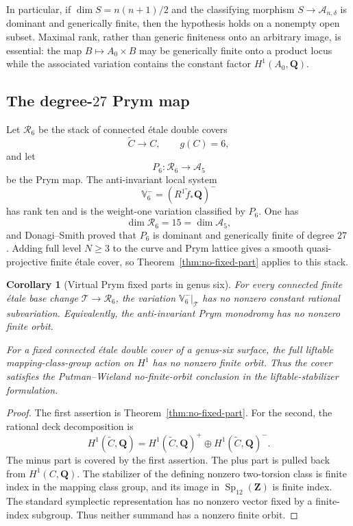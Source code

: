 \documentclass[11pt,reqno]{amsart}
\numberwithin{equation}{section}
\newtheorem{corollary}[theorem]{Corollary}
\theoremstyle{definition}
\theoremstyle{remark}
\newcommand{\Q}{\mathbf Q}
\newcommand{\Z}{\mathbf Z}
\newcommand{\cA}{\mathcal A}
\newcommand{\cR}{\mathcal R}
\newcommand{\Sp}{\operatorname{Sp}}
\begin{document}
In particular, if $\dim S=n(n+1)/2$ and the classifying morphism
$S\to\cA_{n,\delta}$ is dominant and generically finite, then the hypothesis holds on a nonempty open subset.  Maximal rank, rather than generic finiteness onto an arbitrary image, is essential: the map $B\mapsto A_0\times B$ may be generically finite onto a product locus while the associated variation contains the constant factor $H^1(A_0,\Q)$.

\subsection{The degree-\texorpdfstring{$27$}{27} Prym map}

Let $\cR_6$ be the stack of connected \'etale double covers
\[
\widetilde C\longrightarrow C,
\qquad g(C)=6,
\]
and let
\[
P_6:\cR_6\longrightarrow\cA_5
\]
be the Prym map.  The anti-invariant local system
\[
\mathbb V_6^-=(R^1\widetilde f_*\Q)^-
\]
has rank ten and is the weight-one variation classified by $P_6$.  One has
\[
\dim\cR_6=15=\dim\cA_5,
\]
and Donagi--Smith proved that $P_6$ is dominant and generically finite of degree $27$ \cite[Theorem~I.2.1]{DonagiSmith1981}.  Adding full level $N\ge3$ to the curve and Prym lattice gives a smooth quasi-projective finite \'etale cover, so Theorem~\ref{thm:no-fixed-part} applies to this stack.

\begin{corollary}[Virtual Prym fixed parts in genus six]\label{cor:P6}
For every connected finite \'etale base change $\mathscr T\to\cR_6$, the variation $\mathbb V_6^-|_{\mathscr T}$ has no nonzero constant rational subvariation.  Equivalently, the anti-invariant Prym monodromy has no nonzero finite orbit.

For a fixed connected \'etale double cover of a genus-six surface, the full liftable mapping-class-group action on $H^1$ has no nonzero finite orbit.  Thus the cover satisfies the Putman--Wieland no-finite-orbit conclusion in the liftable-stabilizer formulation.
\end{corollary}

\begin{proof}
The first assertion is Theorem~\ref{thm:no-fixed-part}.  For the second, the rational deck decomposition is
\[
H^1(\widetilde C,\Q)=H^1(\widetilde C,\Q)^+
\oplus H^1(\widetilde C,\Q)^-.
\]
The minus part is covered by the first assertion.  The plus part is pulled back from $H^1(C,\Q)$.  The stabilizer of the defining nonzero two-torsion class is finite index in the mapping class group, and its image in $\Sp_{12}(\Z)$ is finite index.  The standard symplectic representation has no nonzero vector fixed by a finite-index subgroup.  Thus neither summand has a nonzero finite orbit.
\end{proof}
\end{document}
